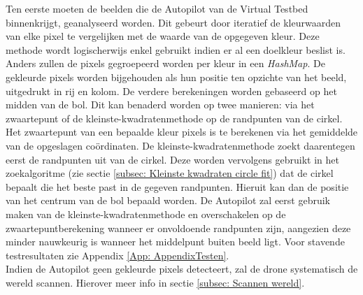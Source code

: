 \noindent
Ten eerste moeten de beelden die de Autopilot van de Virtual Testbed binnenkrijgt, geanalyseerd worden. Dit gebeurt door iteratief de kleurwaarden van elke pixel te vergelijken met de waarde van de opgegeven kleur. Deze methode wordt logischerwijs enkel gebruikt indien er al een doelkleur beslist is. Anders zullen de pixels gegroepeerd worden per kleur in een \textit{HashMap}. De gekleurde pixels worden bijgehouden als hun positie ten opzichte van het beeld, uitgedrukt in rij en kolom. De verdere berekeningen worden gebaseerd op het midden van de bol. Dit kan benaderd worden op twee manieren: via het zwaartepunt of de kleinste-kwadratenmethode op de randpunten van de cirkel. Het zwaartepunt van een bepaalde kleur pixels is te berekenen via het gemiddelde van de opgeslagen co\"ordinaten. De kleinste-kwadratenmethode zoekt daarentegen eerst de randpunten uit van de cirkel. Deze worden vervolgens gebruikt in het zoekalgoritme (zie sectie \ref{subsec: Kleinste kwadraten circle fit}) dat de cirkel bepaalt die het beste past in de gegeven randpunten. Hieruit kan dan de positie van het centrum van de bol bepaald worden. De Autopilot zal eerst gebruik maken van de kleinste-kwadratenmethode en overschakelen op de zwaartepuntberekening wanneer er onvoldoende randpunten zijn, aangezien deze minder nauwkeurig is wanneer het middelpunt buiten beeld ligt. Voor stavende testresultaten zie Appendix \ref{App: AppendixTesten}.
\\
Indien de Autopilot geen gekleurde pixels detecteert, zal de drone systematisch de wereld scannen. Hierover meer info in sectie \ref{subsec: Scannen wereld}.
